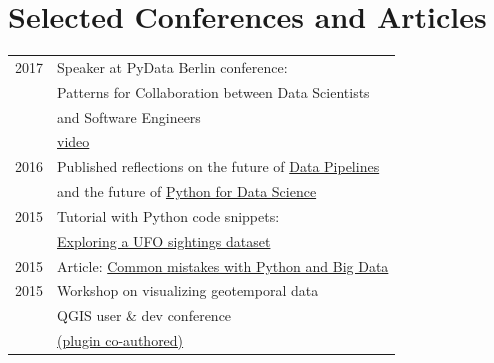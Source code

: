 \documentclass[10pt]{article} %
\begin{document}
\begin{minipage}[t]{0.44\textwidth}








\section{Selected Conferences and Articles} 

\begin{tabular}{rl}
\textsc{2017}
& Speaker at PyData Berlin conference:\\
& Patterns for Collaboration between Data Scientists\\
& and Software Engineers \\
& \href{https://www.youtube.com/watch?v=7oxC7cbRYyE}{video}\\
\textsc{2016}
& Published reflections on the future of \href{http://www.datasciencecentral.com/profiles/blogs/interview-with-karolina-alexiou-building-data-pipelines}{Data Pipelines}\\
& and the future of \href{https://blog.propulsionacademy.com/why-python-for-data-science-is-the-future-b556de75c80c#.mdh3ztapq}{Python for Data Science}\\
\textsc{2015}
& Tutorial with Python code snippets:\\
& \href{https://www.airpair.com/python/posts/using-python-and-qgis-for-geospatial-visualization}{Exploring a UFO sightings dataset}\\
\textsc{2015}
& Article: \href{https://www.airpair.com/python/posts/top-mistakes-python-big-data-analytics}{Common mistakes with Python and Big Data}\\
\textsc{2015}
& Workshop on visualizing geotemporal data\\
& QGIS user \& dev conference \\
& \href{http://github.com/anitagraser/TimeManager}{(plugin co-authored)}
\\


\end{tabular}
\end{minipage}
\end{document}
